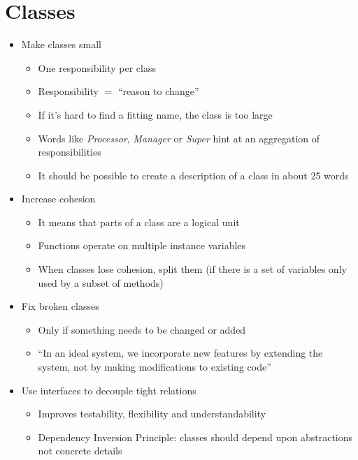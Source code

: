 \section{Classes}
\begin{itemize}
    \item Make classes small
    \begin{itemize}
        \item One responsibility per class
        \item Responsibility $=$ ``reason to change''
        \item If it's hard to find a fitting name, the class is too large
        \item Words like \textit{Processor}, \textit{Manager} or \textit{Super} hint at an aggregation of responsibilities
        \item It should be possible to create a description of a class in about 25 words
    \end{itemize}
    \newpage
    \item Increase cohesion
    \begin{itemize}
        \item It means that parts of a class are a logical unit
        \item Functions operate on multiple instance variables
        \item When classes lose cohesion, split them (if there is a set of variables only used by a subset of methods)
    \end{itemize}
    \item Fix broken classes
    \begin{itemize}
        \item Only if something needs to be changed or added
        \item ``In an ideal system, we incorporate new features by extending the system, not by making modifications to existing code''
    \end{itemize}
    \item Use interfaces to decouple tight relations
    \begin{itemize}
        \item Improves testability, flexibility and understandability
        \item Dependency Inversion Principle: classes should depend upon abstractions not concrete details
    \end{itemize}
\end{itemize}
